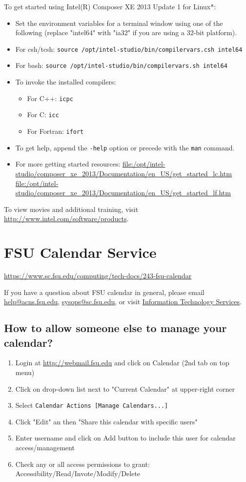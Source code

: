 \documentclass[12pt,a4paper]{article}
\begin{document}
To get started using Intel(R) Composer XE 2013 Update 1 for Linux*:
\begin{itemize}
    \item Set the environment variables for a terminal window using one of the following (replace "intel64" with "ia32" if you are using a 32-bit platform).
    \item For csh/tcsh: \texttt{source /opt/intel-studio/bin/compilervars.csh intel64}
    \item For bash: \texttt{source /opt/intel-studio/bin/compilervars.sh intel64}
    \item To invoke the installed compilers:
    \begin{itemize}
        \item For C++: \texttt{icpc}
        \item For C: \texttt{icc}
        \item For Fortran: \texttt{ifort}
    \end{itemize}
    \item To get help, append the \texttt{-help} option or precede with the \texttt{man} command.
    \item For more getting started resources:
    \url{file:/opt/intel-studio/composer_xe_2013/Documentation/en_US/get_started_lc.htm}
    \url{file:/opt/intel-studio/composer_xe_2013/Documentation/en_US/get_started_lf.htm}
\end{itemize}
To view movies and additional training, visit \url{http://www.intel.com/software/products}.

\section{FSU Calendar Service}
\url{https://www.sc.fsu.edu/computing/tech-docs/243-fsu-calendar}

If you have a question about FSU calendar in general, please email \href{mailto:help@acns.fsu.edu}{help@acns.fsu.edu}, \href{mailto:sysops@sc.fsu.edu}{sysops@sc.fsu.edu}, or visit \href{http://its.fsu.edu/}{Information Technology Services}.

\subsection*{How to allow someone else to manage your calendar?}
\begin{enumerate}
    \item Login at \url{http://webmail.fsu.edu} and click on Calendar (2nd tab on top menu)
    \item Click on drop-down list next to "Current Calendar" at upper-right corner
    \item Select \texttt{Calendar Actions [Manage Calendars...]}
    \item Click "Edit" an then "Share this calendar with specific users"
    \item Enter username and click on Add button to include this user for calendar access/management
    \item Check any or all access permissions to grant: Accessibility/Read/Invote/Modify/Delete
\end{enumerate}
\end{document}
